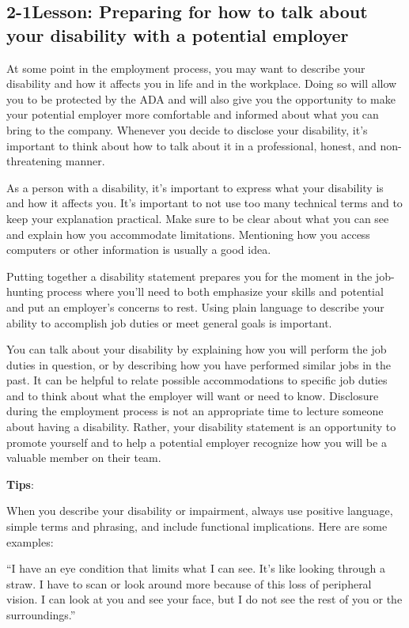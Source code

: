 \pagebreak \subsection*{2-1\quad Lesson: Preparing for how to talk about your disability with a potential employer}
At some point in the employment process, you may want to describe your disability and how it affects you in life and in the workplace. Doing so will allow you to be protected by the ADA and will also give you the opportunity to make your potential employer more comfortable and informed about what you can bring to the company. Whenever you decide to disclose your disability, it's important to think about how to talk about it in a professional, honest, and non-threatening manner.

As a person with a disability, it's important to express what your disability is and how it affects you. It's important to not use too many technical terms and to keep your explanation practical. Make sure to be clear about what you can see and explain how you accommodate limitations. Mentioning how you access computers or other information is usually a good idea.

Putting together a disability statement prepares you for the moment in the job-hunting process where you'll need to both emphasize your skills and potential and put an employer's concerns to rest. Using plain language to describe your ability to accomplish job duties or meet general goals is important.

You can talk about your disability by explaining how you will perform the job duties in question, or by describing how you have performed similar jobs in the past. It can be helpful to relate possible accommodations to specific job duties and to think about what the employer will want or need to know. Disclosure during the employment process is not an appropriate time to lecture someone about having a
disability. Rather, your disability statement is an opportunity to promote yourself and to help a potential employer recognize how you will be a valuable member on their team.

\textbf{Tips}:

When you describe your disability or impairment, always use positive language, simple terms and phrasing, and include functional implications. Here are some examples:

``I have an eye condition that limits what I can see. It's like looking through a straw. I have to scan or look around more because of this loss of peripheral vision. I can look at you and see your face, but I do not see the rest of you or the surroundings.''

